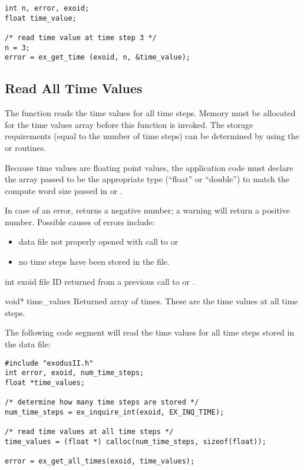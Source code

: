 \begin{lstlisting}
int n, error, exoid;
float time_value;

/* read time value at time step 3 */
n = 3;
error = ex_get_time (exoid, n, &time_value);
\end{lstlisting}

\subsection{Read All Time Values}

The function  reads the time values for all
time steps. Memory must be allocated for the time values array before
this function is invoked. The storage requirements (equal to the
number of time steps) can be determined by using the
 or  routines.

Because time values are floating point values, the application code
must declare the array passed to be the appropriate type (``float'' or
``double'') to match the compute word size passed in
 or .

In case of an error,  returns a negative
number; a warning will return a positive number. Possible causes of
errors include:

\begin{itemize}

 \item data file not properly opened with call to 
 or 

 \item no time steps have been stored in the file.
\end{itemize}



\begin{parameters}
\item[{int exoid \R{}}]
\exo{} file ID returned from a previous call to  or
.

\item[{void* time_values \W{}}]
Returned array of times. These are the time values at all time steps.
\end{parameters}

The following code segment will read the time values for all time
steps stored in the data file:

\begin{lstlisting}
#include "exodusII.h"
int error, exoid, num_time_steps;
float *time_values;

/* determine how many time steps are stored */
num_time_steps = ex_inquire_int(exoid, EX_INQ_TIME);

/* read time values at all time steps */
time_values = (float *) calloc(num_time_steps, sizeof(float));

error = ex_get_all_times(exoid, time_values);
\end{lstlisting}

